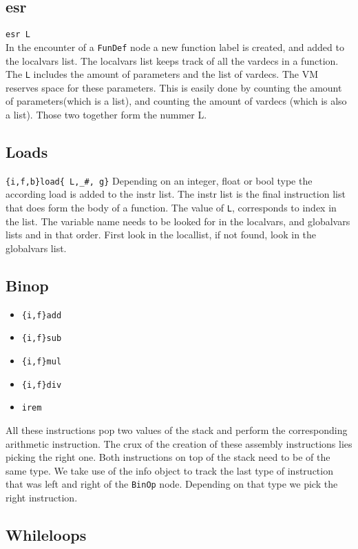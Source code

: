 \documentclass[a4paper]{article}
\begin{document}
\subsection{esr}
\texttt{esr L} \\
In the encounter of a \texttt{FunDef} node a new function label is created, and
added to the localvars list. The localvars list keeps track of all the vardecs
in a function. The \texttt{L} includes the amount of parameters and the list of
vardecs. The VM reserves space for these parameters. This is easily done by
counting the amount of parameters(which is a list), and counting the amount of
vardecs (which is also a list). Those two together form the nummer L.

\subsection{Loads}
\texttt{\{i,f,b\}load\{ L,\_\#, g\}}
Depending on an integer, float or bool type the according load is added to the
instr list. The instr list is the final instruction list that does form the
body of a function. The value of \texttt{L}, corresponds to index in the list.
The variable name needs to be looked for in the localvars, and globalvars
lists and in that order. First look in the locallist, if not found, look in the
globalvars list.

\subsection{Binop}
\begin{itemize}
\item \texttt{\{i,f\}add}
\item \texttt{\{i,f\}sub}
\item \texttt{\{i,f\}mul}
\item \texttt{\{i,f\}div}
\item \texttt{irem}
\end{itemize}
All these instructions pop two values of the stack and perform the
corresponding arithmetic instruction. The crux of the creation of these
assembly instructions lies picking the right one. Both instructions on top of
the stack need to be of the same type. We take use of the info object to track
the last type of instruction that was left and right of the \texttt{BinOp}
node. Depending on that type we pick the right instruction.

\subsection{Whileloops}
\begin{lstlisting}


\end{lstlisting}
\end{document}
